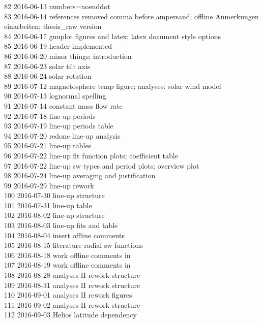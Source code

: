 \begin{footnotesize}
82	2016-06-13	numbers=noenddot\\
83	2016-06-14	references removed comma before ampersand; offline Anmerkungen einarbeiten; thesis\_raw version\\
84	2016-06-17	gnuplot figures and latex; latex document style options\\
85	2016-06-19	header implemented\\
86	2016-06-20	minor things; introduction\\
87	2016-06-23	solar tilt axis\\
88	2016-06-24	solar rotation\\
89	2016-07-12	magnetosphere temp figure; analyses: solar wind model\\
90	2016-07-13	lognormal spelling\\
91	2016-07-14	constant mass flow rate\\
92	2016-07-18	line-up periods\\
93	2016-07-19	line-up periods table\\
94	2016-07-20	redone line-up analysis\\
95	2016-07-21	line-up tables\\
96	2016-07-22	line-up fit function plots; coefficient table\\
97	2016-07-22	line-up sw types and period plots; overview plot\\
98	2016-07-24	line-up averaging and justification\\
99	2016-07-29	line-up rework\\
100	2016-07-30	line-up structure\\
101	2016-07-31	line-up table\\
102	2016-08-02	line-up structure\\
103	2016-08-03	line-up fits and table\\
104	2016-08-04	insert offline comments\\
105	2016-08-15	literature radial sw functions\\
106	2016-08-18	work offline comments in\\
107	2016-08-19	work offline comments in\\
108	2016-08-28	analyses II rework structure\\
109	2016-08-31	analyses II rework structure\\
110	2016-09-01	analyses II rework figures\\
111	2016-09-02	analyses II rework structure\\
112	2016-09-03	Helios latitude dependency\\

\end{footnotesize}
